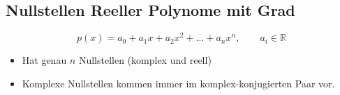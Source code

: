 \subsection{Nullstellen Reeller Polynome mit Grad}
    \vspace{-1em}
    $$
        p(x) = a_0 + a_1 x + a_2 x^2 + \dots + a_n x^n, \qquad a_i \in \mathbb{R}
    $$
    \begin{itemize}
        \item Hat genau $n$ Nullstellen (komplex und reell)
        \item Komplexe Nullstellen kommen immer im komplex-konjugierten Paar vor.
    \end{itemize}